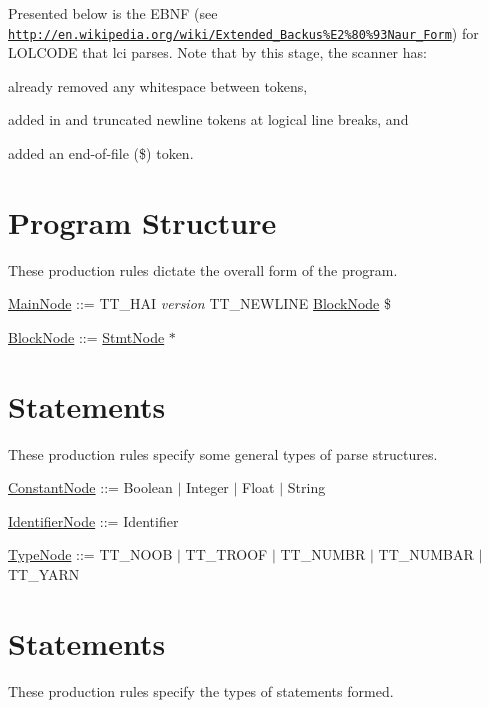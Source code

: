 Presented below is the E\-B\-N\-F (see \href{http://en.wikipedia.org/wiki/Extended_Backus%E2%80%93Naur_Form}{\tt http\-://en.\-wikipedia.\-org/wiki/\-Extended\-\_\-\-Backus\%\-E2\%80\%93\-Naur\-\_\-\-Form}) for L\-O\-L\-C\-O\-D\-E that {\ttfamily lci} parses. Note that by this stage, the scanner has\-:
\begin{DoxyItemize}
\item already removed any whitespace between tokens,
\item added in and truncated newline tokens at logical line breaks, and
\item added an end-\/of-\/file ({\ttfamily \$}) token.
\end{DoxyItemize}\hypertarget{lolebnf_progebnf}{}\section{Program Structure}\label{lolebnf_progebnf}
These production rules dictate the overall form of the program.

\begin{DoxyParagraph}{}
\hyperlink{struct_main_node}{Main\-Node} \-:\-:= {\ttfamily T\-T\-\_\-\-H\-A\-I} {\itshape version\/} {\ttfamily T\-T\-\_\-\-N\-E\-W\-L\-I\-N\-E} \hyperlink{struct_block_node}{Block\-Node} {\ttfamily \$} 
\end{DoxyParagraph}
\begin{DoxyParagraph}{}
\hyperlink{struct_block_node}{Block\-Node} \-:\-:= \hyperlink{struct_stmt_node}{Stmt\-Node} $\ast$
\end{DoxyParagraph}
\hypertarget{lolebnf_stmtebnf}{}\section{Statements}\label{lolebnf_stmtebnf}
These production rules specify some general types of parse structures.

\begin{DoxyParagraph}{}
\hyperlink{struct_constant_node}{Constant\-Node} \-:\-:= Boolean $|$ Integer $|$ Float $|$ String
\end{DoxyParagraph}
\begin{DoxyParagraph}{}
\hyperlink{struct_identifier_node}{Identifier\-Node} \-:\-:= Identifier
\end{DoxyParagraph}
\begin{DoxyParagraph}{}
\hyperlink{struct_type_node}{Type\-Node} \-:\-:= {\ttfamily T\-T\-\_\-\-N\-O\-O\-B} $|$ {\ttfamily T\-T\-\_\-\-T\-R\-O\-O\-F} $|$ {\ttfamily T\-T\-\_\-\-N\-U\-M\-B\-R} $|$ {\ttfamily T\-T\-\_\-\-N\-U\-M\-B\-A\-R} $|$ {\ttfamily T\-T\-\_\-\-Y\-A\-R\-N} 
\end{DoxyParagraph}
\hypertarget{lolebnf_stmtebnf}{}\section{Statements}\label{lolebnf_stmtebnf}
These production rules specify the types of statements formed.

